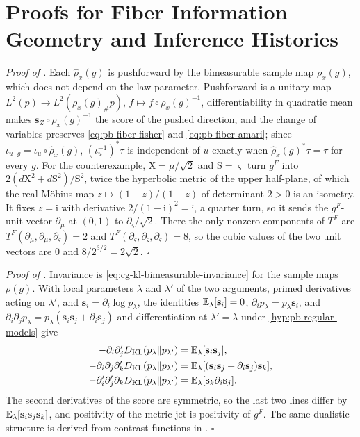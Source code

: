 \section{Proofs for Fiber Information Geometry and Inference Histories}
\label{sec:proofs-fiber-geometry}

\noindent\emph{Proof of .}
Each $\widehat\rho_x(g)$ is pushforward by the bimeasurable sample map $\rho_x(g)$, which
does not depend on the law parameter.  Pushforward is a unitary map
$L^2(p)\to L^2(\rho_x(g)_\#p)$, $f\mapsto f\circ\rho_x(g)^{-1}$, differentiability in
quadratic mean makes $\mathbf s_Z\circ\rho_x(g)^{-1}$ the score of the pushed direction,
and the change of variables preserves \eqref{eq:pb-fiber-fisher} and
\eqref{eq:pb-fiber-amari}; since $\iota_{u\cdot g}=\iota_u\circ\widehat\rho_x(g)$,
$(\iota_u^{-1})^*\tau$ is independent of $u$ exactly when
$\widehat\rho_x(g)^*\tau=\tau$ for every $g$.  For the counterexample,
$\mathrm X=\mu/\sqrt2$ and $\mathrm S=\varsigma$ turn $g^F$ into
$2(d\mathrm X^2+d\mathrm S^2)/\mathrm S^2$, twice the hyperbolic metric of the upper
half-plane, of which the real M\"obius map $z\mapsto(1+z)/(1-z)$ of determinant $2>0$ is
an isometry.  It fixes $z=\mathrm i$ with derivative $2/(1-\mathrm i)^2=\mathrm i$, a
quarter turn, so it sends the $g^F$-unit vector $\partial_\mu$ at $(0,1)$ to
$\partial_\varsigma/\sqrt2$.  There the only nonzero components of $T^F$ are
$T^F(\partial_\mu,\partial_\mu,\partial_\varsigma)=2$ and
$T^F(\partial_\varsigma,\partial_\varsigma,\partial_\varsigma)=8$, so the cubic values of
the two unit vectors are $0$ and $8/2^{3/2}=2\sqrt2$.  $\square$

\noindent\emph{Proof of .}
Invariance is \eqref{eq:cg-kl-bimeasurable-invariance} for the sample maps $\rho(g)$.
With local parameters $\lambda$ and $\lambda'$ of the two arguments, primed derivatives
acting on $\lambda'$, and $\mathbf s_i=\partial_i\log p_\lambda$, the identities
$\mathbb E_\lambda[\mathbf s_i]=0$, $\partial_ip_\lambda=p_\lambda\mathbf s_i$, and
$\partial_i\partial_jp_\lambda=p_\lambda(\mathbf s_i\mathbf s_j+\partial_i\mathbf s_j)$
and differentiation at $\lambda'=\lambda$ under \cref{hyp:pb-regular-models} give
\begin{align}
-\partial_i\partial_j'D_{\mathrm{KL}}(p_\lambda\Vert p_{\lambda'})
&=\mathbb E_\lambda[\mathbf s_i\mathbf s_j],\notag\\
-\partial_i\partial_j\partial_k'D_{\mathrm{KL}}(p_\lambda\Vert p_{\lambda'})
&=\mathbb E_\lambda[(\mathbf s_i\mathbf s_j+\partial_i\mathbf s_j)\mathbf s_k],
\notag\\
-\partial_i'\partial_j'\partial_kD_{\mathrm{KL}}(p_\lambda\Vert p_{\lambda'})
&=\mathbb E_\lambda[\mathbf s_k\partial_i\mathbf s_j].
\label{eq:pb-kl-jet-calculation}
\end{align}
The second derivatives of the score are symmetric, so the last two lines differ by
$\mathbb E_\lambda[\mathbf s_i\mathbf s_j\mathbf s_k]$, and positivity of the metric jet is
positivity of $g^F$.  The same dualistic structure is derived from contrast functions in
\citet{AmariNagaoka2000,AyJostLeSchwachhofer2017}.  $\square$

